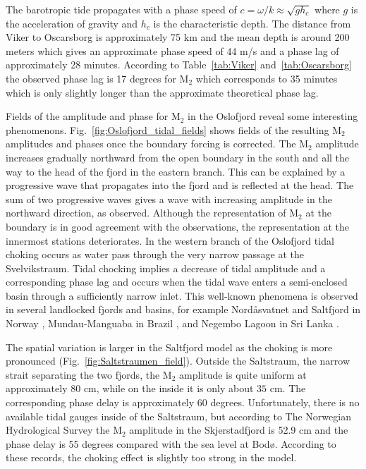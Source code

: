 The barotropic tide propagates with a phase speed of $c = \omega/k \approx \sqrt{g h_c}$ where $g$ is the acceleration of gravity and $h_c$ is the characteristic depth. The distance from Viker to Oscarsborg is approximately 75 km and the mean depth is around 200 meters which gives an approximate phase speed of 44 m/s and a phase lag of approximately 28 minutes. According to Table~\ref{tab:Viker} and~\ref{tab:Oscarsborg} the observed phase lag is 17 degrees for M$_2$ which corresponds to 35 minutes which is only slightly longer than the approximate theoretical phase lag. 

Fields of the amplitude and phase for M$_2$ in the Oslofjord reveal some interesting phenomenons. Fig.~\ref{fig:Oslofjord_tidal_fields} shows fields of the resulting M$_2$ amplitudes and phases once the boundary forcing is corrected. 
The M$_2$ amplitude increases gradually northward from the open boundary in the south and all the way to the head of the fjord in the eastern branch. 
This can be explained by a progressive wave that propagates into the fjord and is reflected at the head.
The sum of two progressive waves gives a wave with increasing amplitude in the northward direction, as observed. 
Although the representation of M$_2$ at the boundary is in good agreement with the observations, the representation at the innermost stations deteriorates.
In the western branch of the Oslofjord tidal choking occurs as water pass through the very narrow passage at the Svelvikstraum. Tidal chocking implies a decrease of tidal amplitude and a corresponding phase lag \cite[]{stigebrandt80} and occurs when the tidal wave enters a semi-enclosed basin through a sufficiently narrow inlet. This well-known phenomena is observed in several landlocked fjords and basins, for example Nord{\aa}svatnet and Saltfjord in Norway \cite[]{glenne63,eliassen01}, Mundau-Manguaba in Brazil \cite[]{oliveira93}, and Negembo Lagoon in Sri Lanka \cite[]{rydberg96}. 

The spatial variation is larger in the Saltfjord model as the choking is more pronounced (Fig.~\ref{fig:Saltstraumen_field}). Outside the Saltstraum, the narrow strait separating the two fjords, the M$_2$ amplitude is quite uniform at approximately $80$ cm, while on the inside it is only about $35$ cm. The corresponding phase delay is approximately $60$ degrees. Unfortunately, there is no available tidal gauges inside of the Saltstraum, but according to The Norwegian Hydrological Survey \cite[]{tide16} the M$_2$ amplitude in the Skjerstadfjord is 52.9 cm and the phase delay is 55 degrees compared with the sea level at Bod{\o}.
According to these records, the choking effect is slightly too strong in the model.

